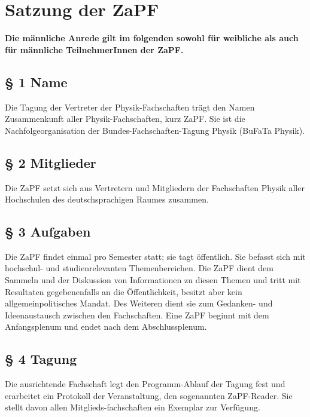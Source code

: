 



\chapter*{Satzung der ZaPF}

\textbf{Die männliche Anrede gilt im folgenden sowohl für weibliche
als auch für männliche
 TeilnehmerInnen der ZaPF.}

\section*{§ 1 Name}
Die Tagung der Vertreter der Physik-Fachschaften trägt den Namen
Zusammenkunft aller Physik-Fachschaften, kurz ZaPF. Sie ist die
Nachfolgeorganisation der Bundes-Fachschaften-Tagung Physik (BuFaTa
Physik).

\section*{§ 2 Mitglieder}
Die ZaPF setzt sich aus Vertretern und Mitgliedern der Fachschaften Physik aller Hochschulen
des deutschsprachigen Raumes zusammen.

\section*{§ 3 Aufgaben}
Die ZaPF findet einmal pro Semester statt; sie tagt öffentlich. Sie
befasst sich mit hochschul- und studienrelevanten Themenbereichen.
Die ZaPF dient dem Sammeln und der Diskussion von Informationen zu
diesen Themen und tritt mit Resultaten gegebenenfalls an die
Öffentlichkeit, besitzt aber kein allgemeinpolitisches Mandat. Des
Weiteren dient sie zum Gedanken- und Ideenaustausch zwischen den
Fachschaften. Eine ZaPF beginnt mit dem Anfangsplenum und endet nach
dem Abschlussplenum.

\section*{§ 4 Tagung}
Die ausrichtende Fachschaft legt den Programm-Ablauf der Tagung fest und erarbeitet ein Protokoll der Veranstaltung,
den sogenannten ZaPF-Reader. Sie stellt davon allen Mitglieds-fachschaften ein Exemplar zur Verfügung.

\newpage
